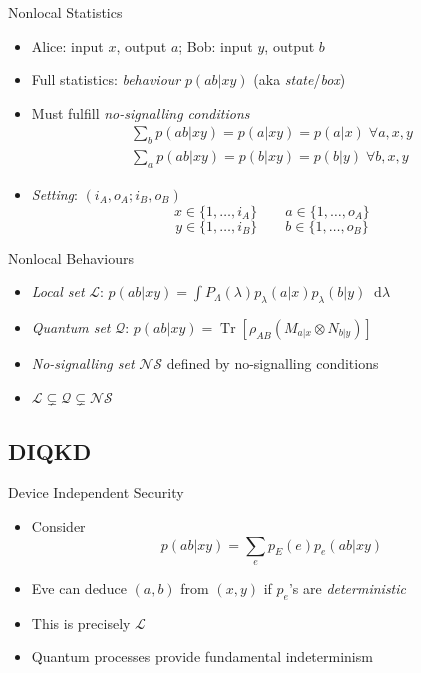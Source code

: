 \documentclass[xcolor=dvipsnames]{beamer}
\newcommand{\dif}{\mathop{}\!\mathrm{d}} %
\newcommand{\dintv}[2]{\mathopen\{#1,\ldots,#2\mathclose\}}
\newcommand{\?}{\mathrel{?}} %
\newcommand{\Tr}[2][]{\mathop{\mathrm{Tr}#1}\left[ #2 \right]} %
\newcommand{\Ls}{\mathcal{L}}
\newcommand{\Qs}{\mathcal{Q}}
\newcommand{\NSs}{\mathcal{NS}}
\begin{document}

\begin{frame}{Nonlocal Statistics}
  \begin{itemize}[<+->]
    \item Alice: input \(x\), output \(a\); Bob: input \(y\), output \(b\)
    \item Full statistics: \emph{behaviour} \(p(ab|xy)\) (aka \emph{state}/\emph{box})
    \item Must fulfill \emph{no-signalling conditions}
      \begin{gather*}
        \sum_b p(ab|xy) = p(a|xy) = p(a|x)\;\forall a,x,y \\
        \sum_a p(ab|xy) = p(b|xy) = p(b|y)\;\forall b,x,y
      \end{gather*}
    \item \emph{Setting}: \((i_A, o_A; i_B, o_B)\)
      \[ x \in \dintv{1}{i_A} \qquad a \in \dintv{1}{o_A} \]
      \[ y \in \dintv{1}{i_B} \qquad b \in \dintv{1}{o_B} \]
  \end{itemize}
\end{frame}

\begin{frame}{Nonlocal Behaviours}
  \begin{itemize}[<+->]
    \item \emph{Local set} \(\Ls\): \(p(ab|xy) = \int P_{\Lambda}(\lambda) p_{\lambda}(a|x)p_{\lambda}(b|y) \dif{\lambda} \)
    \item \emph{Quantum set} \(\Qs\): \(p(ab|xy) = \Tr{ \rho_{AB} \left(M_{a|x} \otimes N_{b|y}\right) }\)
    \item \emph{No-signalling set} \(\NSs\) defined by no-signalling conditions
    \item \(\Ls \subsetneq \Qs \subsetneq \NSs\)
  \end{itemize}
\end{frame}

\subsection{DIQKD}

\begin{frame}{Device Independent Security}
  \begin{itemize}[<+->]
    \item Consider
      \[ p(ab|xy) = \sum_e p_E(e) p_e(ab|xy) \]
    \item Eve can deduce \((a,b)\) from \((x,y)\) if \(p_e\)'s are \emph{deterministic}
    \item This is precisely \(\Ls\)
    \item Quantum processes provide \alert{fundamental indeterminism}
  \end{itemize}
\end{frame}
\end{document}
